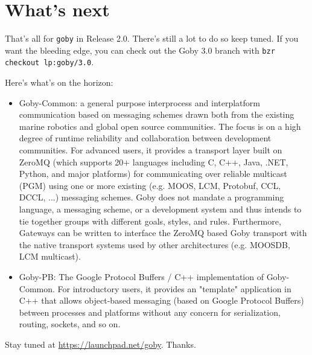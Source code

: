 \chapter{What's next}

That's all for \verb|goby| in Release 2.0. There's still a lot to do so keep tuned. If you want the bleeding edge, you can check out the Goby 3.0 branch with 
\verb|bzr checkout lp:goby/3.0|.

Here's what's on the horizon:
\begin{itemize}
\item Goby-Common: a general purpose interprocess and interplatform communication based on messaging schemes drawn both from the existing marine robotics and global open source communities. The focus is on a high degree of runtime reliability and collaboration between development communities. For advanced users, it provides a transport layer built on ZeroMQ (which supports 20+ languages including C, C++, Java, .NET, Python, and major platforms) for communicating over reliable multicast (PGM) using one or more existing (e.g. MOOS, LCM, Protobuf, CCL, DCCL, ...) messaging schemes. Goby does not mandate a programming language, a messaging scheme, or a development system and thus intends to tie together groups with different goals, styles, and rules. Furthermore, Gateways can be written to interface the ZeroMQ based Goby transport with the native transport systems used by other architectures (e.g. MOOSDB, LCM multicast).
\item Goby-PB: The Google Protocol Buffers / C++ implementation of Goby-Common. For introductory users, it provides an "template" application in C++ that allows object-based messaging (based on Google Protocol Buffers) between processes and platforms without any concern for serialization, routing, sockets, and so on.
\end{itemize}

Stay tuned at \url{https://launchpad.net/goby}. Thanks.

